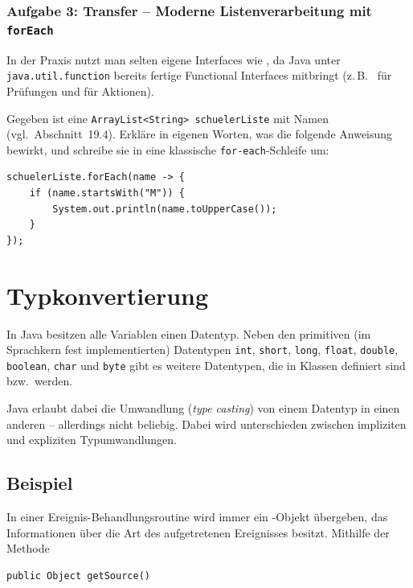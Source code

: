 \subsubsection*{Aufgabe 3: Transfer -- Moderne Listenverarbeitung mit \texttt{forEach} \tagZusatz \tagLK}
In der Praxis nutzt man selten eigene Interfaces wie ,
da Java unter \texttt{java.util.function} bereits fertige Functional Interfaces
mitbringt (z.\,B.\  für Prüfungen und 
für Aktionen).

Gegeben ist eine \lstinline|ArrayList<String> schuelerListe| mit Namen (vgl.\
Abschnitt~19.4). Erkläre in eigenen Worten, was die folgende Anweisung bewirkt,
und schreibe sie in eine klassische \texttt{for-each}-Schleife um:

\begin{lstlisting}
schuelerListe.forEach(name -> {
    if (name.startsWith("M")) {
        System.out.println(name.toUpperCase());
    }
});
\end{lstlisting}


\section{Typkonvertierung \tagZusatz \tagLK}

In Java besitzen alle Variablen einen Datentyp. Neben den primitiven (im
Sprachkern fest implementierten) Datentypen \lstinline|int|, \lstinline|short|,
\lstinline|long|, \lstinline|float|, \lstinline|double|, \lstinline|boolean|,
\lstinline|char| und \lstinline|byte| gibt es weitere Datentypen, die in Klassen
definiert sind bzw.\ werden.

Java erlaubt dabei die Umwandlung (\emph{type casting}) von einem Datentyp in
einen anderen -- allerdings nicht beliebig. Dabei wird unterschieden zwischen
impliziten und expliziten Typumwandlungen.

\subsection{Beispiel}

In einer Ereignis-Behandlungsroutine wird immer ein -Objekt
übergeben, das Informationen über die Art des aufgetretenen Ereignisses
besitzt. Mithilfe der Methode

\begin{lstlisting}
public Object getSource()
\end{lstlisting}

